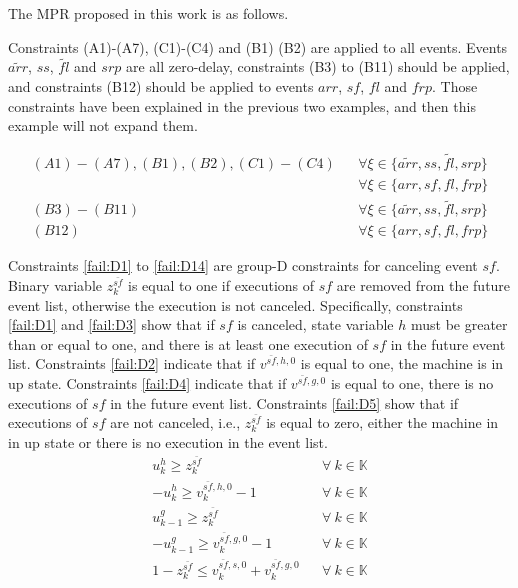 \documentclass[suppldata]{interact}
\theoremstyle{plain}
\theoremstyle{definition}
\theoremstyle{remark}
\begin{document}
The MPR proposed in this work is as follows.

Constraints (A1)-(A7), (C1)-(C4) and (B1) (B2) are applied to all events. Events ${\tilde{arr}}$, ${ss}$, ${\tilde{fl}}$ and ${srp}$ are all zero-delay, constraints (B3) to (B11) should be applied, and constraints (B12) should be applied to events ${arr}$, ${sf}$, ${fl}$ and ${frp}$. Those constraints have been explained in the previous two examples, and then this example will not expand them. 


\begin{eqnarray}
	(A1)-(A7),(B1),(B2),(C1)-(C4)&& \forall \xi \in\{\tilde{arr},ss,\tilde{fl},srp\}\nonumber\\
	&&  \forall\xi \in\{arr,sf,fl,frp\}\nonumber\\
	(B3)-(B11)&& \forall \xi \in\{\tilde{arr},ss,\tilde{fl},srp\}\nonumber\\
	(B12)&& \forall\xi \in\{arr,sf,fl,frp\}\nonumber
\end{eqnarray}

Constraints \eqref{fail:D1} to \eqref{fail:D14} are group-D constraints for canceling event ${sf}$. Binary variable $z^{\bar{sf}}_k$ is equal to one if executions of ${sf}$ are removed from the future event list, otherwise the execution is not canceled. Specifically, constraints \eqref{fail:D1} and \eqref{fail:D3} show that if ${sf}$ is canceled, state variable $h$ must be greater than or equal to one, and there is at least one execution of $sf$ in the future event list. Constraints \eqref{fail:D2} indicate that if $v^{\bar{sf},h,0}$ is equal to one, the machine is in up state. Constraints \eqref{fail:D4} indicate that if $v^{\bar{sf},g,0}$ is equal to one, there is no executions of ${sf}$ in the future event list. Constraints \eqref{fail:D5} show that if executions of ${sf}$ are not canceled, i.e., $z^{\bar{sf}}_k$ is equal to zero, either the machine in in up state or there is no execution in the event list. 
\begin{eqnarray}
	u^{h}_k\ge z^{\bar{sf}}_k&&\forall\ k\in \mathbb{K}\label{fail:D1}\\
	-u^{h}_k\ge v^{\bar{sf},h,0}_k-1&&\forall\ k\in \mathbb{K}\label{fail:D2}\\
	u^{g}_{k-1}\ge z^{\bar{sf}}_k &&\forall\ k\in \mathbb{K}\label{fail:D3}\\
	-u^{g}_{k-1} \ge v^{\bar{sf},g,0}_k-1&&\forall\ k\in \mathbb{K}\label{fail:D4}\\
	1-z^{\bar{sf}}_k\le v^{\bar{sf},s,0}_k+v^{\bar{sf},g,0}_k&&\forall\ k\in \mathbb{K}\label{fail:D5}
\end{eqnarray}
\end{document}
